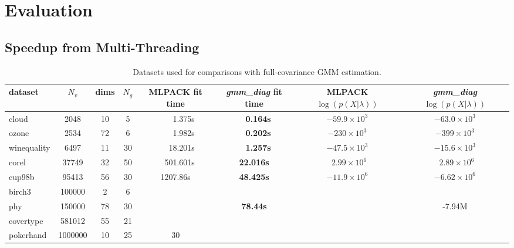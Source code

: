 \section{Evaluation}
\label{sec:eval}

\subsection{Speedup from Multi-Threading}

\begin{table*}
\centering
\small
\begin{tabular}{|l|c|c|c|c|c|c|c|}
\hline
{\bf dataset} & {\bf $N_v$} & {\bf dims} & {\bf $N_g$} & {\bf MLPACK fit time} & {\bfseries {\it\bfseries gmm\_diag} fit time} & {\bf MLPACK $\log(p(X|\lambda))$} & {\bf {\it\bfseries gmm\_diag} $\log(p(X|\lambda))$} \\
\hline
cloud & 2048 & 10 & 5 & ~~~~1.375s & ~~{\bf 0.164s} & $-59.9 \times 10^{3}$ & $-63.0 \times 10^{3}$ \\
ozone & 2534 & 72 & 6 & ~~~~1.982s & ~~{\bf 0.202s} & $-230 \times 10^{3}$ & $-399 \times 10^{3}$ \\
winequality & 6497 & 11 & 30 & ~~~18.201s & ~~{\bf 1.257s} & $-47.5 \times 10^{3}$ & $-15.6 \times 10^{3}$ \\
corel & 37749 & 32 & 50 & ~~501.601s & {\bf 22.016s} & $~~2.99 \times 10^{6}$ & $~~2.89 \times 10^{6}$ \\
cup98b & 95413 & 56 & 30 & 1207.86s & {\bf 48.425s} & $-11.9 \times 10^{6}$ & $-6.62 \times 10^{6}$ \\
birch3 & 100000 & 2 & 6 & \\
phy & 150000 & 78 & 30 & & {\bf 78.44s} & & -7.94M \\
covertype & 581012 & 55 & 21 & \\
pokerhand & 1000000 & 10 & 25 & 30 & \\
\hline
\end{tabular}
\caption{Datasets used for comparisons with full-covariance GMM estimation.}
\label{tab:results}
\end{table*}

